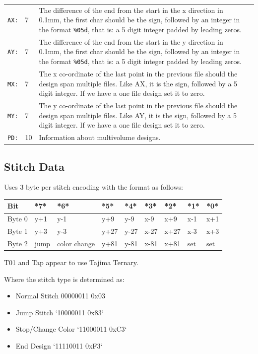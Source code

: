 \documentclass{report}
\begin{document}
\begin{longtable}{l l p{8cm} l}
\texttt{AX:} & 7 & The difference of the end from the start in the x direction in 0.1mm, the first char should be the sign, followed by an integer in the format \texttt{\%05d}, that is: a 5 digit integer padded by leading zeros. \\
\texttt{AY:} & 7 & The difference of the end from the start in the y direction in 0.1mm, the first char should be the sign, followed by an integer in the format \texttt{\%05d}, that is: a 5 digit integer padded by leading zeros. \\
\texttt{MX:} & 7 & The x co-ordinate of the last point in the previous file should the design span multiple files. Like AX, it is the sign, followed by a 5 digit integer. If we have a one file design set it to zero. \\
\texttt{MY:} & 7 & The y co-ordinate of the last point in the previous file should the design span multiple files. Like AY, it is the sign, followed by a 5 digit integer. If we have a one file design set it to zero. \\
\texttt{PD:} & 10 & Information about multivolume designs.
\end{longtable}

\subsection{Stitch Data}

Uses 3 byte per stitch encoding with the format as follows:

\begin{tabular}{l l l l l l l l l}
\textbf{Bit} & *7* & *6* & *5* & *4* & *3* & *2* & *1* & *0* \\
\hline
Byte 0 & y+1 & y-1 & y+9 & y-9 & x-9 & x+9 & x-1 & x+1 \\
Byte 1 & y+3 & y-3 & y+27 & y-27 & x-27 & x+27 & x-3 & x+3 \\
Byte 2 & jump & color change & y+81 & y-81 & x-81 & x+81 & set & set
\end{tabular}

T01 and Tap appear to use Tajima Ternary.
 
Where the stitch type is determined as:

\begin{itemize}
\item Normal Stitch 00000011 0x03
\item Jump Stitch `10000011 0x83`
\item Stop/Change Color `11000011 0xC3`
\item End Design `11110011 0xF3`
\end{itemize}
\end{document}
